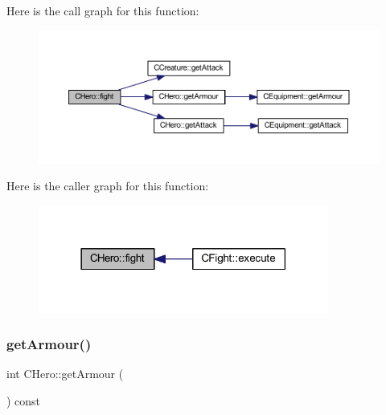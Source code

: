 Here is the call graph for this function\+:\nopagebreak
\begin{figure}[H]
\begin{center}
\leavevmode
\includegraphics[width=350pt]{class_c_hero_a7cda26a24b8e70fc2ffe829e9c984b7e_cgraph}
\end{center}
\end{figure}
Here is the caller graph for this function\+:\nopagebreak
\begin{figure}[H]
\begin{center}
\leavevmode
\includegraphics[width=270pt]{class_c_hero_a7cda26a24b8e70fc2ffe829e9c984b7e_icgraph}
\end{center}
\end{figure}
\mbox{\label{class_c_hero_a50d1e46ce5b1d84c6ed04493f1d71f81}} 
\subsubsection{\texorpdfstring{get\+Armour()}{getArmour()}}
{\footnotesize\ttfamily int C\+Hero\+::get\+Armour (\begin{DoxyParamCaption}{ }\end{DoxyParamCaption}) const\hspace{0.3cm}{\ttfamily [inline]}}

